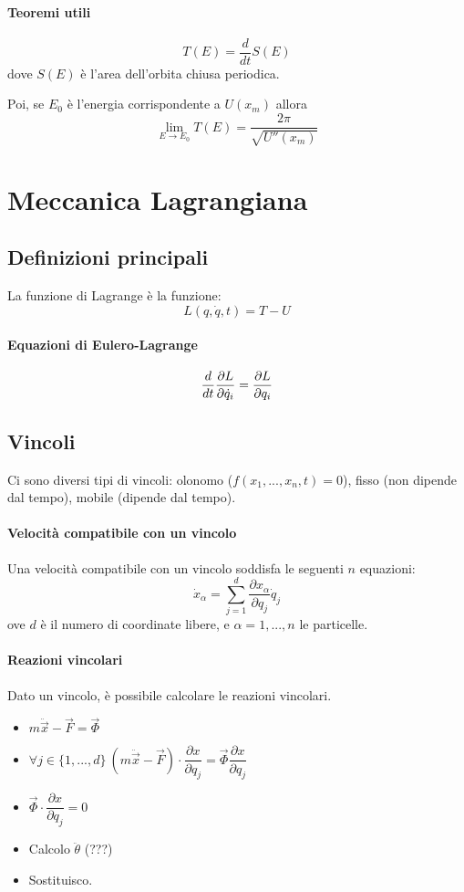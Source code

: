 \documentclass[a4paper,12pt]{article}
\begin{document}
\paragraph{Teoremi utili}
$$T(E) = \dfrac{d}{dt}S(E)$$
dove $S(E)$ è l'area dell'orbita chiusa periodica.

Poi, se $E_0$ è l'energia corrispondente a $U(x_m)$ allora $$\lim_{E\to E_0} T(E) = \dfrac{2\pi}{\sqrt{U''(x_m)}}$$


\section{Meccanica Lagrangiana}
\subsection{Definizioni principali}
La funzione di Lagrange è la funzione:
$$ L(q, \dot{q}, t) = T - U $$
\paragraph{Equazioni di Eulero-Lagrange}
$${d \over dt}\dfrac{\partial L}{\partial\dot{q}_i} = \dfrac{\partial L}{\partial q_i}$$

\subsection{Vincoli}
Ci sono diversi tipi di vincoli: olonomo ($f(x_1,...,x_n, t)=0$), fisso (non dipende dal tempo), mobile (dipende dal tempo).
\paragraph{Velocità compatibile con un vincolo}
Una velocità compatibile con un vincolo soddisfa le seguenti $n$ equazioni:
$$\dot{x}_\alpha = \sum_{j=1}^d \frac{\partial x_\alpha}{\partial q_j} \dot{q}_j$$
ove $d$ è il numero di coordinate libere, e $\alpha={1,...,n}$ le particelle.
\paragraph{Reazioni vincolari}
Dato un vincolo, è possibile calcolare le reazioni vincolari.
\begin{itemize}
 \item $m\ddot{\vec{x}}-\vec{F} = \vec{\Phi}$
 \item $\forall j \in \{1,...,d\}\ (m\ddot{\vec{x}}-\vec{F})\cdot \dfrac{\partial x}{\partial q_j} = \vec{\Phi}\dfrac{\partial x}{\partial q_j}$
 \item $\vec{\Phi}\cdot\dfrac{\partial x}{\partial q_j}=0$
 \item Calcolo $\ddot{\theta}$ (???)
 \item Sostituisco.
\end{itemize}
\end{document}
